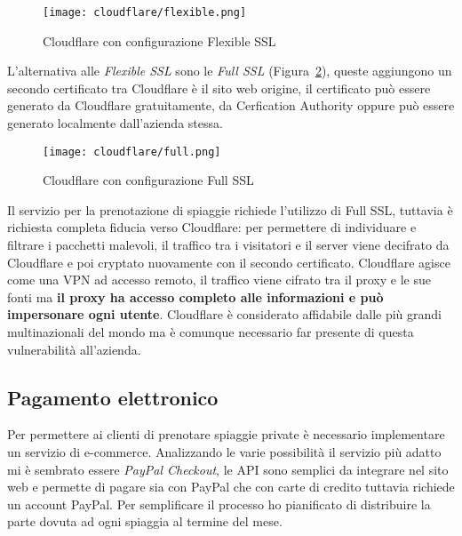 \begin{figure}[htpb]
    \centering
    \texttt{[image: cloudflare/flexible.png]}
    \caption{Cloudflare con configurazione Flexible SSL}%
    \label{fig:flexiblessl}
\end{figure}

L'alternativa alle \emph{Flexible SSL} sono le \emph{Full SSL} (Figura~\ref{fig:fullssl}), queste aggiungono un secondo certificato tra Cloudflare \`e il sito web origine, il certificato pu\`o essere generato da Cloudflare gratuitamente, da Cerfication Authority oppure pu\`o essere generato localmente dall'azienda stessa. %

\begin{figure}[htpb]
    \centering
    \texttt{[image: cloudflare/full.png]}
    \caption{Cloudflare con configurazione Full SSL}%
    \label{fig:fullssl}
\end{figure}

Il servizio per la prenotazione di spiaggie richiede l'utilizzo di Full SSL, tuttavia \`e richiesta completa fiducia verso Cloudflare: per permettere di individuare e filtrare i pacchetti malevoli, il traffico tra i visitatori e il server viene decifrato da Cloudflare e poi cryptato nuovamente con il secondo certificato. Cloudflare agisce come una VPN ad accesso remoto, il traffico viene cifrato tra il proxy e le sue fonti ma \textbf{il proxy ha accesso completo alle informazioni e pu\`o impersonare ogni utente}. Cloudflare \`e considerato affidabile dalle pi\`u grandi multinazionali del mondo ma \`e comunque necessario far presente di questa vulnerabilit\`a all'azienda. 

\subsection{Pagamento elettronico}%
\label{sub:pagamento_elettronico}

Per permettere ai clienti di prenotare spiaggie private \`e necessario implementare un servizio di e-commerce. Analizzando le varie possibilit\`a il servizio pi\`u adatto mi \`e sembrato essere \emph{PayPal Checkout}, le API sono semplici da integrare nel sito web e permette di pagare sia con PayPal che con carte di credito tuttavia richiede un account PayPal. Per semplificare il processo ho pianificato di distribuire la parte dovuta ad ogni spiaggia al termine del mese.